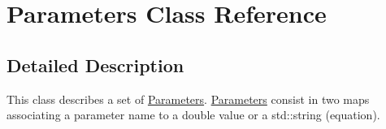 \hypertarget{class_parameters}{}\section{Parameters Class Reference}
\label{class_parameters}


\subsection{Detailed Description}
This class describes a set of \mbox{\hyperlink{class_parameters}{Parameters}}. \mbox{\hyperlink{class_parameters}{Parameters}} consist in two maps associating a parameter name to a double value or a std\+::string (equation). 